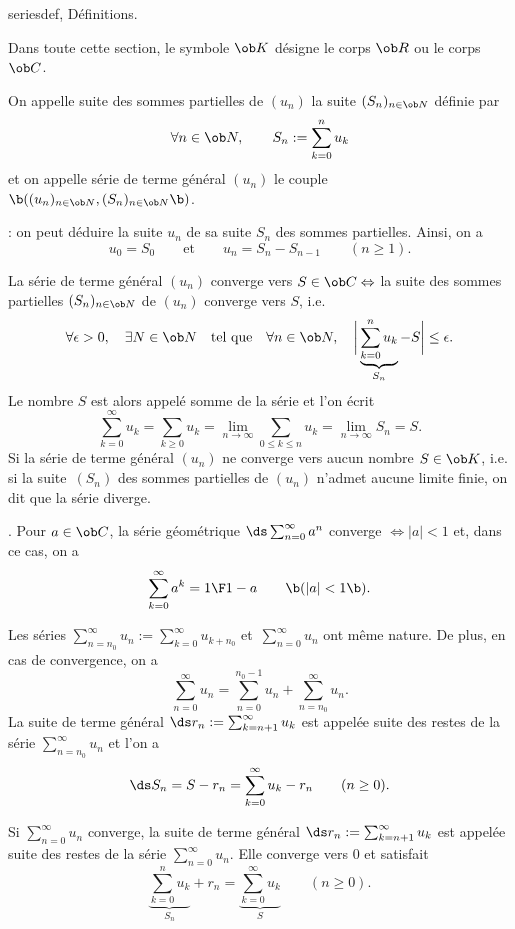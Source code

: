 \Subsection seriesdef, Définitions. 

Dans toute cette section, le symbole $\ob K$ désigne le corps $\ob R$ ou le corps $\ob C$. 
\bigskip

On appelle suite des sommes partielles de $(u_n)$ la suite $(S_n)_{n\in\ob N}$ définie par 
$$
\forall n\in\ob N, \qquad S_n:=\sum_{k=0}^nu_k
$$ 
et on appelle série de terme général $(u_n)$ le couple $\b((u_n)_{n\in\ob N},(S_n)_{n\in\ob N}\b)$. 
\bigskip

\Remarque : on peut déduire la suite $u_n$ de sa suite $S_n$ des sommes partielles. Ainsi, on a 
$$
u_0=S_0\qquad \mbox{et}\qquad u_n=S_n-S_{n-1}\qquad(n\ge1). 
$$

La série de terme général $(u_n)$ converge vers $S\in\ob C\Leftrightarrow$ 
la suite des sommes partielles $(S_n)_{n\in\ob N}$ de $(u_n)$ converge vers $S$, i.e. 
$$
\forall\epsilon>0,\quad \exists N\in\ob N\quad \mbox{tel que} \quad \forall n\in\ob N, \quad 
\bigg|\underbrace{\sum_{k=0}^nu_k}_{S_n}-S\bigg|\le\epsilon. 
$$
Le nombre $S$ est alors appelé somme de la série et l'on écrit 
$$
\sum_{k=0}^\infty u_k=\sum_{k\ge0}u_k=\lim_{n\to\infty}\sum_{0\le k\le n}u_k=\lim_{n\to\infty}S_n=S. 
$$ 
Si la série de terme général $(u_n)$ ne converge vers aucun nombre $S\in\ob K$, i.e. si la suite~$(S_n)$ des sommes partielles de $(u_n)$ n'admet aucune limite finie, 
on dit que la série diverge. 
\medskip

\Exemple. Pour $a\in\ob C$, la série géométrique $\ds\sum_{n=0}^\infty a^n$ converge $\Leftrightarrow|a|<1$ et, dans ce cas, on a 
$$
\sum_{k=0}^\infty a^k={1\F1-a}\qquad\b(|a|<1\b). 
$$

Les séries $\sum_{n=n_0}^\infty u_n:=\sum_{k=0}^\infty u_{k+n_0}$ et~$\sum_{n=0}^\infty u_n$ ont même nature. 
De plus, en cas de convergence, on a 
$$
\sum_{n=0}^\infty u_n=\sum_{n=0}^{n_0-1}u_n+\sum_{n=n_0}^\infty u_n.
$$
La suite de terme général $\ds r_n:=\sum_{k=n+1}^\infty u_k$ 
est appelée suite des restes de la série $\sum_{n=n_0}^\infty u_n$ et l'on a 
$$
\ds S_n=S-r_n=\sum_{k=0}^\infty u_k-r_n\qquad(n\ge0).
$$ 

Si $\sum_{n=0}^\infty u_n$ converge, la suite de terme général $\ds r_n:=\sum_{k=n+1}^\infty u_k$ 
est appelée suite des restes de la série $\sum_{n=0}^\infty u_n$. Elle converge vers $0$ et satisfait 
$$
\underbrace{\sum_{k=0}^nu_k}_{S_n}+r_n=\underbrace{\sum_{k=0}^\infty u_k}_{S}\qquad(n\ge0).
$$ 


